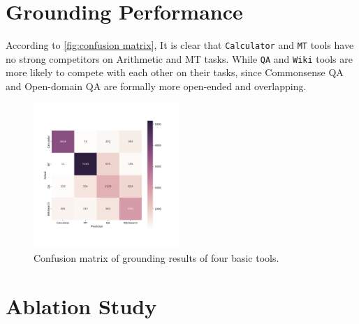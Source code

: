 \documentclass[11pt]{article}
\newcommand{\calc}{{\tt Calculator}}
\newcommand{\mt}{{\tt MT}}
\newcommand{\qa}{{\tt QA}}
\newcommand{\wiki}{{\tt Wiki}}
\begin{document}
\section{Grounding Performance}
\label{Appendix:grounding experiment}
According to \autoref{fig:confusion matrix}, It is clear that \calc{} and \mt{} tools have no strong competitors on Arithmetic and MT tasks. While \qa{} and \wiki{} tools are more likely to compete with each other on their tasks, since Commonsense QA and Open-domain QA are formally more open-ended and overlapping.
\begin{figure}[h]
    \centering
    \includegraphics[width=0.49\textwidth]{figures/confusion_matrix.png}
    \caption{Confusion matrix of grounding results of four basic tools.}
    \label{fig:confusion matrix}
\end{figure}


\section{Ablation Study}
\label{Appendix: Ablation Study}
\end{document}
